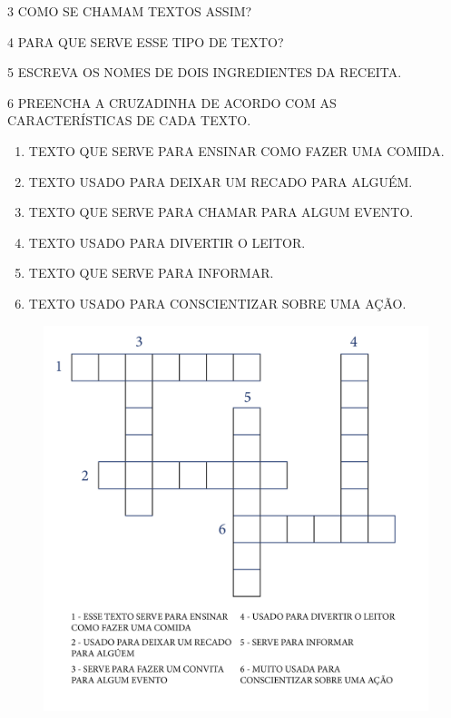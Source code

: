 \num{3} COMO SE CHAMAM TEXTOS ASSIM?


\num{4} PARA QUE SERVE ESSE TIPO DE TEXTO?


\num{5} ESCREVA OS NOMES DE DOIS INGREDIENTES DA RECEITA.




\num{6} PREENCHA A CRUZADINHA DE ACORDO COM AS CARACTERÍSTICAS DE CADA TEXTO.

\begin{enumerate}[itemsep=-5pt]
	\item TEXTO QUE SERVE PARA ENSINAR COMO FAZER UMA COMIDA.
	\item TEXTO USADO PARA DEIXAR UM RECADO PARA ALGUÉM.
	\item TEXTO QUE SERVE PARA CHAMAR PARA ALGUM EVENTO.
	\item TEXTO USADO PARA DIVERTIR O LEITOR.
	\item TEXTO QUE SERVE PARA INFORMAR.
	\item TEXTO USADO PARA CONSCIENTIZAR SOBRE UMA AÇÃO.
\end{enumerate}

\begin{figure}[H]
\centering
\includegraphics[width=.9\textwidth]{media/image155.png}
\end{figure}

